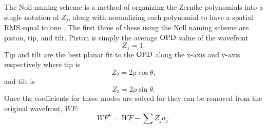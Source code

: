 The Noll naming scheme is a method of organizing the Zernike polynomials into a single notation of $Z_j$, along with normalizing each polynomial to have a spatial RMS equal to one \cite{Noll-1976-HHKzd88f}.
The first three of these using the Noll naming scheme are piston, tip, and tilt.
Piston is simply the average $\operatorname{OPD}$ value of the wavefront
\begin{equation}
  Z_1 = 1 \textrm{.}
  \label{eqn:07_zernike_1}
\end{equation}
Tip and tilt are the best planar fit to the $\operatorname{OPD}$ along the x-axis and y-axis respectively where tip is
\begin{equation}
  Z_2 = 2\rho\cos\theta \textrm{,}
  \label{eqn:07_zernike_2}
\end{equation}
and tilt is
\begin{equation}
  Z_3 = 2\rho\sin\theta \textrm{.}
  \label{eqn:07_zernike_3}
\end{equation}
Once the coefficients for these modes are solved for they can be removed from the original wavefront, $WF$:
\begin{equation}
  WF^F = WF-\sum Z_ja_j \textrm{.}
\end{equation}

